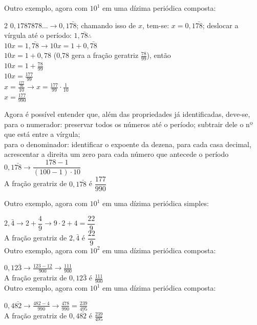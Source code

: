 Outro exemplo, agora com $ 10^1 $ em uma dízima periódica composta:
\begin{multicols}{2}
	\setlength{\columnseprule}{.5pt}
	$ 0,1787878 \hdots  \longrightarrow 0,1\bar{78} $;
	chamando isso de $ x $, tem-se: $ x = 0,1\bar{78} $;
	deslocar a vírgula até o período: $ 1,\bar{78} \therefore $ \\
	$ 10x = 1,\bar{78} \longrightarrow 10x = 1 + 0,\bar{78} $\\
	$ 10x = 1 + 0,78 $ (0,78 gera a fração geratriz $ \frac{78}{99} $), então \\
	$ 10x = 1 + \frac{78}{99} $\\
	$ 10x = \frac{177}{99} $\\
	$ x = \frac{\frac{177}{99}}{10} \longrightarrow x = \frac{177}{99}\cdot\frac{1}{10} $\\
	\noindent$ x = \frac{177}{990} $
	
	\columnbreak
	Agora é possível entender que, além das propriedades já identificadas, deve-se, para o numerador: preservar todos os números até o período; subtrair dele o nº que está entre a vírgula;\\
	para o denominador: identificar o expoente da dezena, para cada casa decimal, acrescentar a direita um zero para cada número que antecede o período\\
	
	$ 0,1\bar{78} \longrightarrow \dfrac{178 - 1}{(100-1) \cdot 10} $\\
	A fração geratriz de $ 0,1\bar{78} $ é $ \dfrac{177}{990} $
	
\end{multicols}

Outro exemplo, agora com $ 10^1 $ em uma dízima periódica simples:
	
	$ 2,\bar{4} \longrightarrow 2 + \dfrac{4}{9} \longrightarrow 9 \cdot 2 + 4 = \dfrac{22}{9} $\\
	A fração geratriz de $ 2,\bar{4} $ é $ \dfrac{22}{9} $\\

Outro exemplo, agora com $ 10^2 $ em uma dízima periódica composta:

$ 0,12\bar{3} \longrightarrow \frac{123-12}{900} \longrightarrow \frac{111}{900} $\\
A fração geratriz de $ 0,12\bar{3} $ é $ \frac{111}{900} $\\

Outro exemplo, agora com $ 10^1 $ em uma dízima periódica composta:

$ 0,4\bar{82} \longrightarrow \frac{482-4}{990} \longrightarrow \frac{478}{990} = \frac{239}{495} $\\
A fração geratriz de $ 0,4\bar{82} $ é $ \frac{239}{495} $

